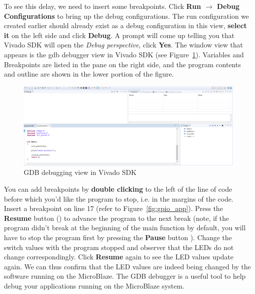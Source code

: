 \documentclass[11pt]{article}
\begin{document}
To see this delay, we need to insert some breakpoints. Click \textbf{Run $\rightarrow$ Debug Configurations} to bring up the debug configurations. The run configuration we created earlier should already exist as a debug configuration in this view, \textbf{select it} on the left side and click \textbf{Debug}. A prompt will come up telling you that Vivado SDK will open the \textit{Debug perspective}, click \textbf{Yes}. The window view that appears is the gdb debugger view in Vivado SDK (see Figure~\ref{fig:gdb_view}). Variables and Breakpoints are listed in the pane on the right side, and the program contents and outline are shown in the lower portion of the figure.

\begin{figure}[!b]
    \centering
    \includegraphics[width=\textwidth]{images/gdb_view.png}
    \caption{GDB debugging view in Vivado SDK}
    \label{fig:gdb_view}
\end{figure}

You can add breakpoints by \textbf{double clicking} to the left of the line of code before which you'd like the program to stop, i.e. in the margins of the code. Insert a breakpoint on line 17 (refer to Figure~\ref{fig:gpio_app}). Press the \textbf{Resume} button
()
to advance the program to the next break (note, if the program didn't break at the beginning of the main function by default, you will have to stop the program first by pressing the \textbf{Pause} button
). Change the switch values with the program stopped and observer that the LEDs do not change correspondingly. Click \textbf{Resume} again to see the LED values update again. We can thus confirm that the LED values are indeed being changed by the software running on the MicroBlaze. The GDB debugger is a useful tool to help debug your applications running on the MicroBlaze system.
\end{document}
